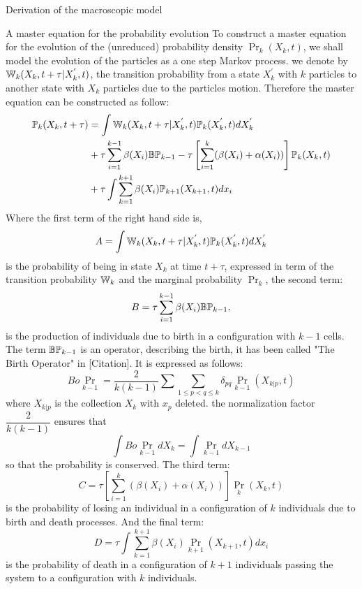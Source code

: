 \begin{paragraph}{Derivation of the macroscopic model}
\begin{paragraph}{A master equation for the probability evolution}
To construct a master equation for the evolution of the (unreduced) probability density $\Pr_k(X_k,t)$, we shall model the evolution of the particles as a one step Markov process. 
we denote by ${\mathbb{W}}_k(X_k, t+\tau \vert X_k^{'},t)$, the transition probability from a state $X_k^{'}$ with $k$ particles to another state with $X_k$ particles due to the particles motion. Therefore the master equation can be constructed as follow:
\begin{align}
\label{masterEquation}
{\mathbb{P}}_k(X_k, t+\tau) &= \int {\mathbb{W}}_k(X_k, t+\tau \vert X_k^{'},t){\mathbb{P}}_k( X_k^{'},t)d X_k^{'} \nonumber \\ 
&+ \tau \sum_{i=1}^{k-1}\beta(X_i) {\mathbb{B}} {\mathbb{P}}_{k-1} - \tau \left[ \sum_{i=1}^{k} (\beta(X_i) + \alpha(X_i)) \right] {\mathbb{P}}_k(X_k,t) \\ 
&+ \tau \int \sum_{k=1}^{k+1} \beta(X_i) {\mathbb{P}}_{k+1}(X_{k+1}, t)dx_i \nonumber
\end{align}
Where the first term of the right hand side is, 
$$ A = \int {\mathbb{W}}_k(X_k, t+\tau \vert X_k^{'},t){\mathbb{P}}_k( X_k^{'},t)d X_k^{'}$$
is the probability of being in state $X_k$ at time $t+\tau$, expressed in term of the transition probability ${\mathbb{W}}_k$ and the marginal probability $\Pr_k$, the second term: 
$$B = \tau \sum_{i=1}^{k-1}\beta(X_i) {\mathbb{B}} {\mathbb{P}}_{k-1},$$ 
is the production of individuals due to birth in a configuration with $k-1$ cells. The term ${\mathbb{B}} {\mathbb{P}}_{k-1}$ is an operator, describing the birth, it has been called "The Birth Operator" in [Citation]. It is expressed as follows: 
\begin{equation}
\label{birthOperator}
Bo \Pr_{k-1} = \dfrac{2}{k(k-1)} \sum \sum_{1 \leq p < q \leq k} \delta_{pq} \Pr_{k-1} (X_{k|p},t) 
\end{equation}
where $X_{k|p}$ is the collection $X_k$ with $x_p$ deleted. the normalization  factor $\dfrac{2}{k(k-1)}$ ensures that
\begin{equation}
\int Bo \Pr_{k-1} dX_k = \int \Pr_{k-1} dX_{k-1}
\end{equation}
so that the probability is conserved. The third term:
$$C=  \tau \left[ \sum_{i=1}^{k} (\beta(X_i) + \alpha(X_i)) \right] \Pr_k(X_k,t)$$
is the probability of losing an individual in a configuration of $k$ individuals due to birth and death processes. And the final term:
$$D = \tau \int \sum_{k=1}^{k+1} \beta(X_i) \Pr_{k+1}(X_{k+1}, t)dx_i$$ 
is the probability of death in a configuration of $k+1$ individuals passing the system to a configuration with $k$ individuals.


\end{paragraph}
\end{paragraph}
